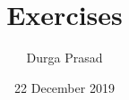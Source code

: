 \documentclass{beamer}
\title[Your Short Title]{Exercises}
\author{Durga Prasad}
\institute{}
\date{22 December 2019}
\begin{document}
\begin{frame}
  \titlepage
\end{frame}








\end{document}

